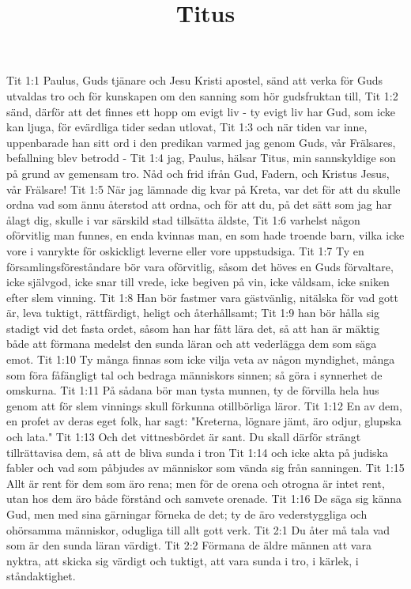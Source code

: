 

\title{Titus}

Tit 1:1  Paulus, Guds tjänare och Jesu Kristi apostel, sänd att verka för Guds utvaldas tro och för kunskapen om den sanning som hör gudsfruktan till,
Tit 1:2  sänd, därför att det finnes ett hopp om evigt liv - ty evigt liv har Gud, som icke kan ljuga, för evärdliga tider sedan utlovat,
Tit 1:3  och när tiden var inne, uppenbarade han sitt ord i den predikan varmed jag genom Guds, vår Frälsares, befallning blev betrodd -
Tit 1:4  jag, Paulus, hälsar Titus, min sannskyldige son på grund av gemensam tro. Nåd och frid ifrån Gud, Fadern, och Kristus Jesus, vår Frälsare!
Tit 1:5  När jag lämnade dig kvar på Kreta, var det för att du skulle ordna vad som ännu återstod att ordna, och för att du, på det sätt som jag har ålagt dig, skulle i var särskild stad tillsätta äldste,
Tit 1:6  varhelst någon oförvitlig man funnes, en enda kvinnas man, en som hade troende barn, vilka icke vore i vanrykte för oskickligt leverne eller vore uppstudsiga.
Tit 1:7  Ty en församlingsföreståndare bör vara oförvitlig, såsom det höves en Guds förvaltare, icke självgod, icke snar till vrede, icke begiven på vin, icke våldsam, icke sniken efter slem vinning.
Tit 1:8  Han bör fastmer vara gästvänlig, nitälska för vad gott är, leva tuktigt, rättfärdigt, heligt och återhållsamt;
Tit 1:9  han bör hålla sig stadigt vid det fasta ordet, såsom han har fått lära det, så att han är mäktig både att förmana medelst den sunda läran och att vederlägga dem som säga emot.
Tit 1:10  Ty många finnas som icke vilja veta av någon myndighet, många som föra fåfängligt tal och bedraga människors sinnen; så göra i synnerhet de omskurna.
Tit 1:11  På sådana bör man tysta munnen, ty de förvilla hela hus genom att för slem vinnings skull förkunna otillbörliga läror.
Tit 1:12  En av dem, en profet av deras eget folk, har sagt: "Kreterna, lögnare jämt, äro odjur, glupska och lata."
Tit 1:13  Och det vittnesbördet är sant. Du skall därför strängt tillrättavisa dem, så att de bliva sunda i tron
Tit 1:14  och icke akta på judiska fabler och vad som påbjudes av människor som vända sig från sanningen.
Tit 1:15  Allt är rent för dem som äro rena; men för de orena och otrogna är intet rent, utan hos dem äro både förstånd och samvete orenade.
Tit 1:16  De säga sig känna Gud, men med sina gärningar förneka de det; ty de äro vederstyggliga och ohörsamma människor, odugliga till allt gott verk.
Tit 2:1  Du åter må tala vad som är den sunda läran värdigt.
Tit 2:2  Förmana de äldre männen att vara nyktra, att skicka sig värdigt och tuktigt, att vara sunda i tro, i kärlek, i ståndaktighet.
